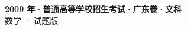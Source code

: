 \documentclass[zihao=-4, a4paper]{ctexart}
\begin{document}
\begin{center}
  {\Large\bfseries 2009 年·普通高等学校招生考试·广东卷·文科}\\[4pt]
  {\large 数学 · 试题版}
\end{center}
\medskip
{}

\end{document}
